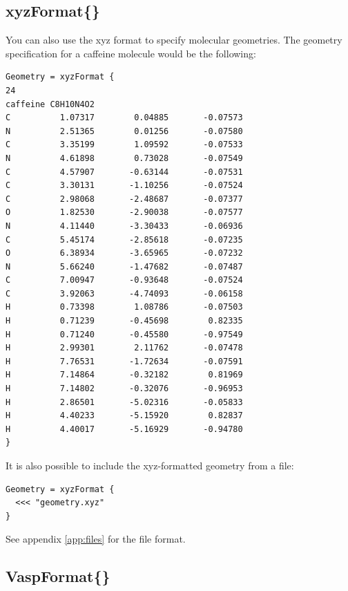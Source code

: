 \subsection{xyzFormat\{\}}
\label{sec:dftbp.xyzFormat}

You can also use the xyz format to specify molecular geometries.
The geometry specification for a caffeine molecule would be the following:
\begin{verbatim}
Geometry = xyzFormat {
24
caffeine C8H10N4O2
C          1.07317        0.04885       -0.07573
N          2.51365        0.01256       -0.07580
C          3.35199        1.09592       -0.07533
N          4.61898        0.73028       -0.07549
C          4.57907       -0.63144       -0.07531
C          3.30131       -1.10256       -0.07524
C          2.98068       -2.48687       -0.07377
O          1.82530       -2.90038       -0.07577
N          4.11440       -3.30433       -0.06936
C          5.45174       -2.85618       -0.07235
O          6.38934       -3.65965       -0.07232
N          5.66240       -1.47682       -0.07487
C          7.00947       -0.93648       -0.07524
C          3.92063       -4.74093       -0.06158
H          0.73398        1.08786       -0.07503
H          0.71239       -0.45698        0.82335
H          0.71240       -0.45580       -0.97549
H          2.99301        2.11762       -0.07478
H          7.76531       -1.72634       -0.07591
H          7.14864       -0.32182        0.81969
H          7.14802       -0.32076       -0.96953
H          2.86501       -5.02316       -0.05833
H          4.40233       -5.15920        0.82837
H          4.40017       -5.16929       -0.94780
}
\end{verbatim}
It is also possible to include the xyz-formatted geometry from a file:
\begin{verbatim}
Geometry = xyzFormat {
  <<< "geometry.xyz"
}
\end{verbatim}

See appendix \ref{app:files} for the file format.

\subsection{VaspFormat\{\}}
\label{sec:dftbp.VaspFormat}

